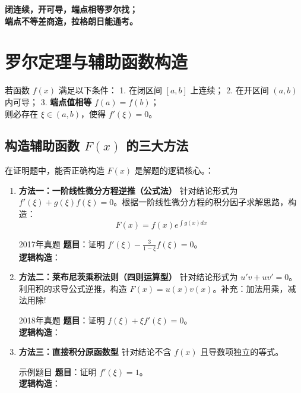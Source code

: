 \documentclass[UTF8]{ctexart}
\begin{document}
\begin{tcolorbox}[colback=yellow!10, colframe=orange!80!black, title=【冲刺口诀】]
\textbf{闭连续，开可导，端点相等罗尔找；} \\
\textbf{端点不等差商造，拉格朗日能通考。}
\end{tcolorbox}

\section{罗尔定理与辅助函数构造}

\begin{conceptbox}[定理 1：罗尔定理]
若函数 $f(x)$ 满足以下条件：
1. 在闭区间 $[a, b]$ 上连续；
2. 在开区间 $(a, b)$ 内可导；
3. \textbf{端点值相等} $f(a)=f(b)$；\\
则必存在 $\xi \in (a, b)$，使得 $f'(\xi)=0$。
\end{conceptbox}

\subsection{构造辅助函数 $F(x)$ 的三大方法}
在证明题中，能否正确构造 $F(x)$ 是解题的逻辑核心。：

\begin{enumerate}
    \item \textbf{方法一：一阶线性微分方程逆推（公式法）}
    针对结论形式为 $f'(\xi) + g(\xi)f(\xi) = 0$。根据一阶线性微分方程的积分因子求解思路，构造：
    $$F(x) = f(x) e^{\int g(x) dx}$$
    
    \begin{examnote}{2017年真题}
    \textbf{题目}：证明 $f'(\xi) - \frac{3}{1-\xi}f(\xi) = 0$。\\
    \textbf{逻辑构造}：\vspace{1.5cm} %
    \end{examnote}

    \item \textbf{方法二：莱布尼茨乘积法则（四则运算型）}
    针对结论形式为 $u' v + u v' = 0$。利用积的求导公式逆推，构造 $F(x) = u(x)v(x)$。补充：加法用乘，减法用除!
    
    \begin{examnote}{2018年真题}
    \textbf{题目}：证明 $f(\xi) + \xi f'(\xi) = 0$。\\
    \textbf{逻辑构造}：\vspace{1.5cm} %
    \end{examnote}

    \item \textbf{方法三：直接积分原函数型}
    针对结论不含 $f(x)$ 且导数项独立的等式。
    
    \begin{examnote}{示例题目}
    \textbf{题目}：证明 $f'(\xi) = 1$。\\
    \textbf{逻辑构造}：\vspace{1.5cm} %
    \end{examnote}
\end{enumerate}
\end{document}
